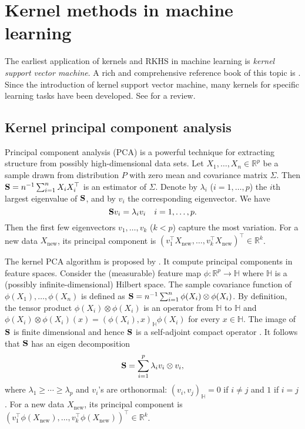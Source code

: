 \documentclass[11pt]{article}
\theoremstyle{plain}
\theoremstyle{definition}
\theoremstyle{remark}
\begin{document}
\section{Kernel methods in machine learning}
The earliest application of kernels and RKHS in machine learning is \emph{kernel support vector machine}.
A rich and comprehensive reference book of this topic is \cite{book:274797}.
Since the introduction of kernel support vector machine, many kernels for specific learning tasks have been developed.
See \cite{hofmann2008} for a review.
\subsection{Kernel principal component analysis}
Principal component analysis (PCA) is a powerful technique for extracting structure from possibly high-dimensional data sets.
Let $X_1,\ldots,X_n \in \mathbb R^p$ be a sample drawn from distribution $P$ with zero mean and covariance matrix $\Sigma$.
Then $\mathbf{S}=n^{-1}\sum_{i=1}^n X_i X_i^\top$ is an estimator of $\Sigma$.
Denote by $\lambda_i$ ($i=1,\ldots, p$) the $i$th largest eigenvalue of $\mathbf{S}$, and by $v_i$ the corresponding eigenvector.
We have
\begin{equation*}
    \mathbf{S} v_i= \lambda_i v_i\quad i=1,\ldots, p.
\end{equation*}
Then the first few eigenvectors $v_1,\ldots,v_k$ ($k< p$) capture the most variation.
For a new data $X_{\text {new}}$, its principal component is $( v_1^\top X_{\text {new}},\ldots, v_k^\top X_{\text {new}})^\top \in \mathbb R^k$.



The kernel PCA algorithm is proposed by \cite{6790375}.
It compute principal components in feature spaces.
Consider the (measurable) feature map $\phi: \mathbb R^p \to \mathbb H$ where $\mathbb H$ is a (possibly infinite-dimensional) Hilbert space.
The sample covariance function of $\phi(X_1),\ldots, \phi(X_n)$ is defined as $\mathbf{S}=n^{-1}\sum_{i=1}^n \phi(X_i) \otimes \phi(X_i)$.
By definition,
the tensor product $\phi(X_i) \otimes \phi(X_i)$ is an operator from $\mathbb H$ to $\mathbb H$ and $\phi(X_i) \otimes \phi(X_i) (x)=(\phi(X_i), x)_{\mathbb H} \phi(X_i)$ for every $x\in \mathbb H$.
The image of $\mathbf{S}$ is finite dimensional and hence $\mathbf{S}$ is a self-adjoint compact operator \cite{book:1323324}.
It follows that $\mathbf{S}$ has an eigen decomposition
\begin{equation*}
    \mathbf{S}=\sum_{i=1}^p \lambda_i v_i \otimes v_i,
\end{equation*}
where $\lambda_1\geq \cdots \geq \lambda_p$ and $v_i$'s are orthonormal: $( v_i, v_j)_{\mathbb H}=0$ if $i\neq j$ and $1$ if $i=j$.
For a new data $X_{\text{new}}$, its principal component is $( v_1^\top \phi(X_{\text {new}}),\ldots, v_k^\top \phi(X_{\text {new}}))^\top \in \mathbb R^k$.
\end{document}
